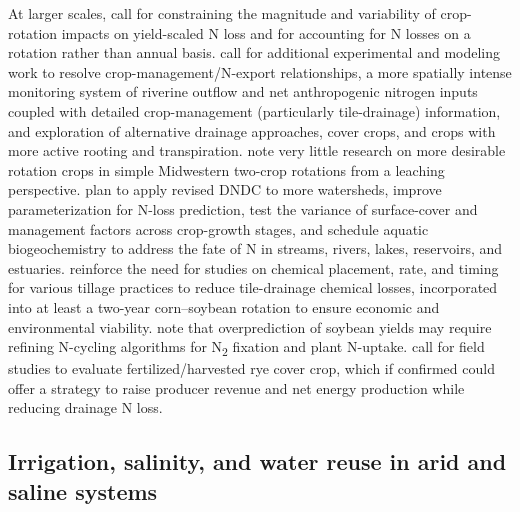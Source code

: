 At larger scales, \textcite{Zhao2016} call for constraining the magnitude and variability of crop-rotation impacts on yield-scaled N loss and for accounting for N losses on a rotation rather than annual basis. \textcite{Raymond2012} call for additional experimental and modeling work to resolve crop-management/N-export relationships, a more spatially intense monitoring system of riverine outflow and net anthropogenic nitrogen inputs coupled with detailed crop-management (particularly tile-drainage) information, and exploration of alternative drainage approaches, cover crops, and crops with more active rooting and transpiration. \textcite{Pasley2021} note very little research on more desirable rotation crops in simple Midwestern two-crop rotations from a leaching perspective. \textcite{Deng2011} plan to apply revised DNDC to more watersheds, improve parameterization for N-loss prediction, test the variance of surface-cover and management factors across crop-growth stages, and schedule aquatic biogeochemistry to address the fate of N in streams, rivers, lakes, reservoirs, and estuaries. \textcite{Kanwar1997} reinforce the need for studies on chemical placement, rate, and timing for various tillage practices to reduce tile-drainage chemical losses, incorporated into at least a two-year corn--soybean rotation to ensure economic and environmental viability. \textcite{Bakhsh2004} note that overprediction of soybean yields may require refining N-cycling algorithms for N\textsubscript{2} fixation and plant N-uptake. \textcite{Malone2018} call for field studies to evaluate fertilized/harvested rye cover crop, which if confirmed could offer a strategy to raise producer revenue and net energy production while reducing drainage N loss.

\subsection{Irrigation, salinity, and water reuse in arid and saline systems}


